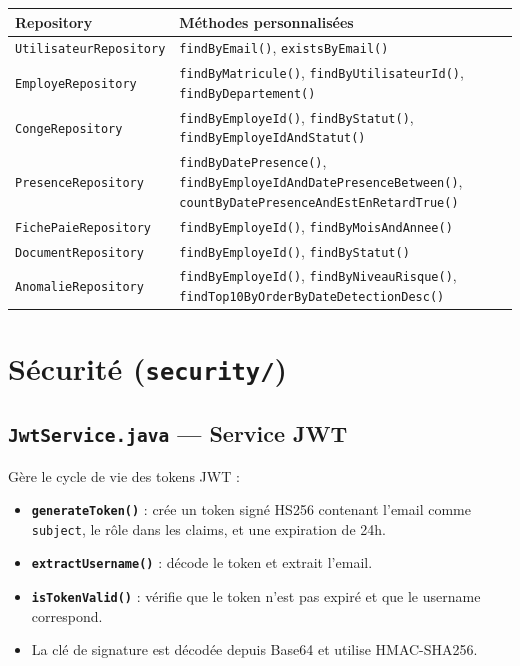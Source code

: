 \documentclass[a4paper,12pt]{report}
\begin{document}
\begin{center}
\begin{tabularx}{\textwidth}{|l|X|}
\hline
\textbf{Repository} & \textbf{Méthodes personnalisées} \\
\hline
\texttt{UtilisateurRepository} & \texttt{findByEmail()}, \texttt{existsByEmail()} \\
\hline
\texttt{EmployeRepository} & \texttt{findByMatricule()}, \texttt{findByUtilisateurId()}, \texttt{findByDepartement()} \\
\hline
\texttt{CongeRepository} & \texttt{findByEmployeId()}, \texttt{findByStatut()}, \texttt{findByEmployeIdAndStatut()} \\
\hline
\texttt{PresenceRepository} & \texttt{findByDatePresence()}, \texttt{findByEmployeIdAndDatePresenceBetween()}, \texttt{countByDatePresenceAndEstEnRetardTrue()} \\
\hline
\texttt{FichePaieRepository} & \texttt{findByEmployeId()}, \texttt{findByMoisAndAnnee()} \\
\hline
\texttt{DocumentRepository} & \texttt{findByEmployeId()}, \texttt{findByStatut()} \\
\hline
\texttt{AnomalieRepository} & \texttt{findByEmployeId()}, \texttt{findByNiveauRisque()}, \texttt{findTop10ByOrderByDateDetectionDesc()} \\
\hline
\end{tabularx}
\end{center}

\section{Sécurité (\texttt{security/})}

\subsection{\texttt{JwtService.java} --- Service JWT}
Gère le cycle de vie des tokens JWT :
\begin{itemize}
  \item \textbf{\texttt{generateToken()}} : crée un token signé HS256 contenant l'email comme \texttt{subject}, le rôle dans les claims, et une expiration de 24h.
  \item \textbf{\texttt{extractUsername()}} : décode le token et extrait l'email.
  \item \textbf{\texttt{isTokenValid()}} : vérifie que le token n'est pas expiré et que le username correspond.
  \item La clé de signature est décodée depuis Base64 et utilise HMAC-SHA256.
\end{itemize}
\end{document}
